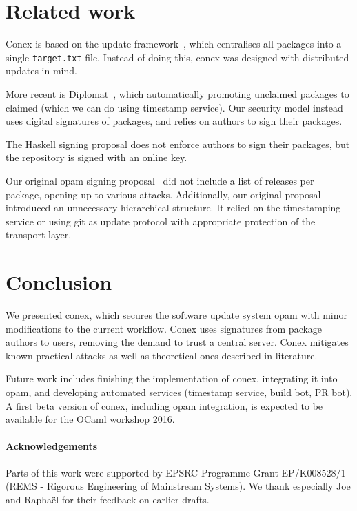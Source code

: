 \documentclass[nocopyrightspace]{sigplanconf}
\begin{document}
\section{Related work} \label{sec:related}
Conex is based on the update framework~\cite{tuf}, which centralises all packages into a single \texttt{target.txt} file.
Instead of doing this, conex was designed with distributed updates in mind.

More recent is Diplomat~\cite{diplomat}, which automatically promoting unclaimed packages to claimed (which we can do using timestamp service).
Our security model instead uses digital signatures of packages, and relies on authors to sign their packages.

The Haskell signing proposal does not enforce authors to sign their packages, but the repository is signed with an online key.

Our original opam signing proposal~\cite{opamsigning} did not include a list of releases per package, opening up to various attacks.
Additionally, our original proposal introduced an unnecessary hierarchical structure.
It relied on the timestamping service or using git as update protocol with appropriate protection of the transport layer.


\section{Conclusion} \label{sec:conclusion}
We presented conex, which secures the software update system opam with minor modifications to the current workflow.
Conex uses signatures from package authors to users, removing the demand to trust a central server.
Conex mitigates known practical attacks as well as theoretical ones described in literature.

Future work includes finishing the implementation of conex, integrating it into opam, and developing automated services (timestamp service, build bot, PR bot).
A first beta version of conex, including opam integration, is expected to be available for the OCaml workshop 2016.

\paragraph{Acknowledgements} Parts of this work were supported by EPSRC Programme Grant EP/K008528/1 (REMS - Rigorous Engineering of Mainstream Systems).  We thank especially Joe and Rapha\"el for their feedback on earlier drafts.



\end{document}
